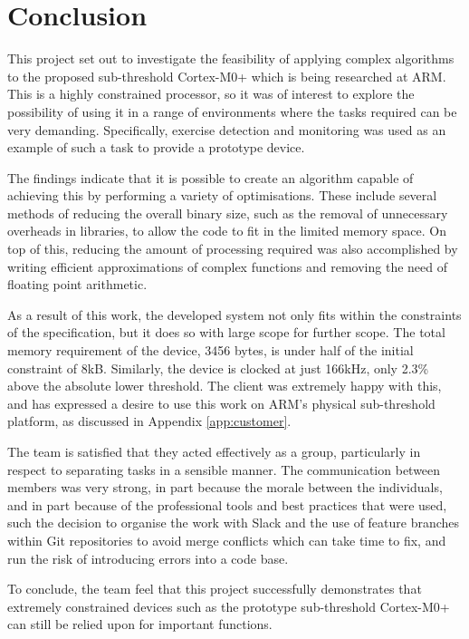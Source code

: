 \chapter{Conclusion}

This project set out to investigate the feasibility of applying complex algorithms to the proposed sub-threshold Cortex-M0+ which is being researched at ARM. This is a highly constrained processor, so it was of interest to explore the possibility of using it in a range of environments where the tasks required can be very demanding. Specifically, exercise detection and monitoring was used as an example of such a task to provide a prototype device.

The findings indicate that it is possible to create an algorithm capable of achieving this by performing a variety of optimisations. These include several methods of reducing the overall binary size, such as the removal of unnecessary overheads in libraries, to allow the code to fit in the limited memory space. On top of this, reducing the amount of processing required was also accomplished by writing efficient approximations of complex functions and removing the need of floating point arithmetic.

As a result of this work, the developed system not only fits within the constraints of the specification, but it does so with large scope for further scope. The total memory requirement of the device, 3456 bytes, is under half of the initial constraint of 8kB. Similarly, the device is clocked at just 166kHz, only 2.3\% above the absolute lower threshold. The client was extremely happy with this, and has expressed a desire to use this work on ARM's physical sub-threshold platform, as discussed in Appendix \ref{app:customer}.

The team is satisfied that they acted effectively as a group, particularly in respect to separating tasks in a sensible manner. The communication between members was very strong, in part because the morale between the individuals, and in part because of the professional tools and best practices that were used, such the decision to organise the work with Slack and the use of feature branches within Git repositories to avoid merge conflicts which can take time to fix, and run the risk of introducing errors into a code base.

To conclude, the team feel that this project successfully demonstrates that extremely constrained devices such as the prototype sub-threshold Cortex-M0+ can still be relied upon for important functions.
